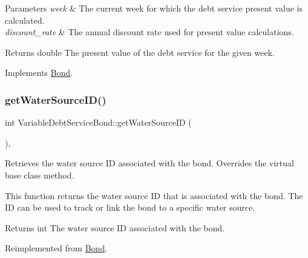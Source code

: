 \begin{DoxyParams}{Parameters}
{\em week} & The current week for which the debt service present value is calculated. \\
\hline
{\em discount\+\_\+rate} & The annual discount rate used for present value calculations.\\
\hline
\end{DoxyParams}
\begin{DoxyReturn}{Returns}
double The present value of the debt service for the given week. 
\end{DoxyReturn}


Implements \mbox{\hyperlink{classBond_a322d4ab0c0c72824ac4df5df80f14d24}{Bond}}.

\mbox{\label{classVariableDebtServiceBond_a3edee29f26e8ac74f9767770c6a951c9}} 
\subsubsection{\texorpdfstring{get\+Water\+Source\+I\+D()}{getWaterSourceID()}}
{\footnotesize\ttfamily int Variable\+Debt\+Service\+Bond\+::get\+Water\+Source\+ID (\begin{DoxyParamCaption}{ }\end{DoxyParamCaption})\hspace{0.3cm}{\ttfamily [override]}, {\ttfamily [virtual]}}



Retrieves the water source ID associated with the bond. Overrides the virtual base class method. 

This function returns the water source ID that is associated with the bond. The ID can be used to track or link the bond to a specific water source.

\begin{DoxyReturn}{Returns}
int The water source ID associated with the bond. 
\end{DoxyReturn}


Reimplemented from \mbox{\hyperlink{classBond_a8190ab6482e6a9481afca4840147527e}{Bond}}.

\mbox{\label{classVariableDebtServiceBond_a7d91921482f01d9bb37dba6e6d085771}} 
